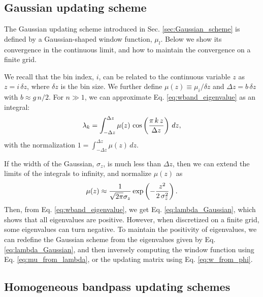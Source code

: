 \documentclass[reprint, superscriptaddress, floatfix]{revtex4-1}
\begin{document}
\subsection{\label{sec:Gaussian_math}
Gaussian updating scheme}



The Gaussian updating scheme introduced in Sec. \ref{sec:Gaussian_scheme}
is defined by a Gaussian-shaped window function, $\mu_l$.
%
%
Below we show its convergence
in the continuous limit,
and how to maintain the convergence
on a finite grid.



We recall that
the bin index, $i$, can be related to
the continuous variable $z$ as
$z = i \, \delta z$,
where
$\delta z$ is the bin size.
%
We further define
$\mu(z) \equiv \mu_i/\delta z$
and
$\Delta z = b \, \delta z$
with $b \approx g\,n/2$.
%
For $n \gg 1$,
we can approximate Eq. \eqref{eq:wband_eigenvalue}
as an integral:
%
\begin{equation}
  \lambda_k
  =
  \int_{-\Delta z}^{\Delta z}
    \mu(z) \, \cos\left( \frac{ \pi \, k \, z } { \Delta z} \right)
    \, d z,
  \notag
\end{equation}
%
with the normalization
$1 = \int_{-\Delta z}^{\Delta z} \mu(z) \, dz$.

If the width of the Gaussian, $\sigma_z$,
is much less than $\Delta z$,
then we can extend the limits of the integrals
to infinity, and normalize $\mu(z)$ as
%
\begin{equation}
  \mu(z)
  \approx
  \frac{            1            }
       { \sqrt{ 2 \pi } \sigma_z }
  \exp\left(
        -\frac{   z^2   }
              { 2 \, \sigma_z^2 }
      \right)
  .
\notag
\end{equation}
%
Then, from Eq. \eqref{eq:wband_eigenvalue},
we get Eq. \eqref{eq:lambda_Gaussian},
which shows that all eigenvalues are positive.
%
However,
when discretized on a finite grid,
some eigenvalues can turn negative.
%
To maintain the positivity of eigenvalues,
we can redefine the Gaussian scheme
from the eigenvalues given by Eq. \eqref{eq:lambda_Gaussian},
and then inversely computing the window function
using Eq. \eqref{eq:mu_from_lambda},
or the updating matrix using Eq. \eqref{eq:w_from_phi}.




\subsection{\label{sec:homo_bandpass}
Homogeneous bandpass updating schemes}
\end{document}
